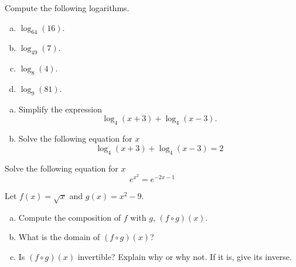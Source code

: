 \documentclass[12pt]{amsart}
\begin{document}
\begin{thm}[10 Points]
  Compute the following logarithms.
  \begin{enumerate}[(a)]
  \item
    $\log_{64}(16)$.
    \vspace{.5in}
  \item
    $\log_{49}(7)$.
    \vspace{.5in}
  \item
    $\log_8(4)$.
    \vspace{.5in}
  \item
    $\log_{9}(81)$.
    \vspace{.5in}
  \end{enumerate}
\end{thm}

\newpage

\begin{thm}[10 Points]
  \begin{enumerate}[(a)]
  \item
    Simplify the expression 
    $$\log_4(x + 3) + \log_4(x - 3).$$
    \vspace{2in}
  \item
    Solve the following equation for $x$
    $$\log_4(x + 3) + \log_4(x - 3) = 2$$
    \vspace{1in}
  \end{enumerate}
\end{thm}

\begin{thm}[10 Points]
  Solve the following equation for $x$
  $$e^{x^2} = e^{-2x - 1}$$
\end{thm}

\newpage

\begin{thm}[10 Points]
  Let $f(x) = \sqrt{x}$ and $g(x) = x^2 - 9$.
  \begin{enumerate}[(a)]
  \item
    Compute the composition of $f$ with $g$, $(f \circ g)(x)$.
    \vspace{1in}
  \item
    What is the domain of $(f \circ g)(x)$?
    \vspace{1in}
  \item
    Is $(f \circ g)(x)$ invertible?  Explain why or why not.  If it is, give its inverse.
    \vspace{1in}
  \end{enumerate}
\end{thm}
\end{document}
